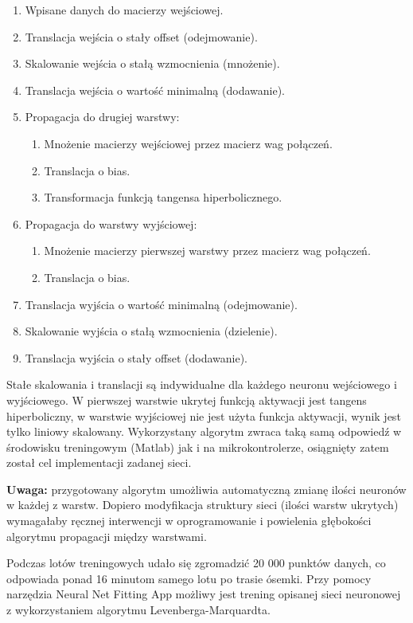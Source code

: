 \documentclass[12pt, a4paper]{article}
\begin{document}
\begin{enumerate}
    \item Wpisane danych do macierzy wejściowej.
	\item Translacja wejścia o stały offset (odejmowanie).
	\item Skalowanie wejścia o stałą wzmocnienia (mnożenie).
	\item Translacja wejścia o wartość minimalną (dodawanie).
	\item Propagacja do drugiej warstwy:
	\begin{enumerate}
		\item Mnożenie macierzy wejściowej przez macierz wag połączeń.
		\item Translacja o bias.
		\item Transformacja funkcją tangensa hiperbolicznego.
	\end{enumerate}
	\item Propagacja do warstwy wyjściowej:
	\begin{enumerate}
		\item Mnożenie macierzy pierwszej warstwy przez macierz wag połączeń.
		\item Translacja o bias.
	\end{enumerate}
	\item Translacja wyjścia o wartość minimalną (odejmowanie).
	\item Skalowanie wyjścia o stałą wzmocnienia (dzielenie).
	\item Translacja wyjścia o stały offset (dodawanie).
\end{enumerate}

Stałe skalowania i translacji są indywidualne dla każdego neuronu wejściowego i wyjściowego. W pierwszej warstwie ukrytej funkcją aktywacji jest tangens hiperboliczny, w warstwie wyjściowej nie jest użyta funkcja aktywacji, wynik jest tylko liniowy skalowany. Wykorzystany algorytm zwraca taką samą odpowiedź w środowisku treningowym (Matlab) jak i na mikrokontrolerze, osiągnięty zatem został cel implementacji zadanej sieci.

\textbf{Uwaga:} przygotowany algorytm umożliwia automatyczną zmianę ilości neuronów w każdej z warstw. Dopiero modyfikacja struktury sieci (ilości warstw ukrytych) wymagałaby ręcznej interwencji w oprogramowanie i powielenia głębokości algorytmu propagacji między warstwami.

Podczas lotów treningowych udało się zgromadzić 20 000 punktów danych, co odpowiada ponad 16 minutom samego lotu po trasie ósemki. Przy pomocy narzędzia Neural Net Fitting App możliwy jest trening opisanej sieci neuronowej z wykorzystaniem algorytmu Levenberga-Marquardta. 
\end{document}
